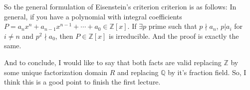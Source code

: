 So the general formulation of Eisenstein's criterion criterion is as follows: In general, if you have a polynomial with integral coefficients $P =a_n x^n + a_{n-1} x^{n-1} + \cdots + a_0 \in \mathbb{Z}[x]$. If $\exists p$ prime such that $p\nmid a_n$, $p|a_i$ for $i\neq n$ and $p^2\nmid a_0$, then $P\in\mathbb{Z}[x]$ is irreducible. And the proof is exactly the same. 

And to conclude, I would like to say that both facts are valid replacing $\mathbb{Z}$ by some unique factorization domain $R$ and replacing $\mathbb{Q}$ by it's fraction field. So, I think this is a good point to finish the first lecture.

